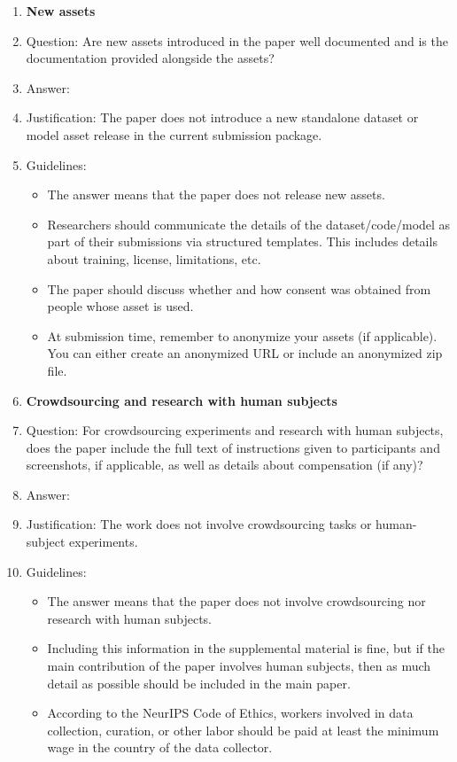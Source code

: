 \documentclass{article}
\begin{document}
\begin{enumerate}
\item {\bf New assets}
    \item[] Question: Are new assets introduced in the paper well documented and is the documentation provided alongside the assets?
    \item[] Answer: \answerNA{} %
    \item[] Justification: The paper does not introduce a new standalone dataset or model asset release in the current submission package.
    \item[] Guidelines:
    \begin{itemize}
        \item The answer \answerNA{} means that the paper does not release new assets.
        \item Researchers should communicate the details of the dataset\slash code\slash model as part of their submissions via structured templates. This includes details about training, license, limitations, etc. 
        \item The paper should discuss whether and how consent was obtained from people whose asset is used.
        \item At submission time, remember to anonymize your assets (if applicable). You can either create an anonymized URL or include an anonymized zip file.
    \end{itemize}

\item {\bf Crowdsourcing and research with human subjects}
    \item[] Question: For crowdsourcing experiments and research with human subjects, does the paper include the full text of instructions given to participants and screenshots, if applicable, as well as details about compensation (if any)? 
    \item[] Answer: \answerNA{} %
    \item[] Justification: The work does not involve crowdsourcing tasks or human-subject experiments.
    \item[] Guidelines:
    \begin{itemize}
        \item The answer \answerNA{} means that the paper does not involve crowdsourcing nor research with human subjects.
        \item Including this information in the supplemental material is fine, but if the main contribution of the paper involves human subjects, then as much detail as possible should be included in the main paper. 
        \item According to the NeurIPS Code of Ethics, workers involved in data collection, curation, or other labor should be paid at least the minimum wage in the country of the data collector. 
    \end{itemize}


\end{enumerate}
\end{document}
